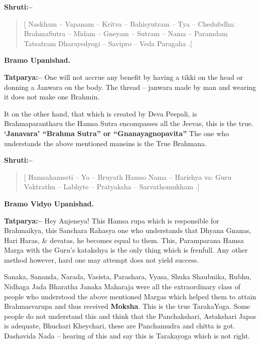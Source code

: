 \textbf{Shruti:–}

\begin{verse}
[ Naskham – Vapanam – Kritva – Bahisyutram – Tya – Chedubdha:  BrahmaSutra – Midam – Gneyam – Sutram – Nama – Paramdam  Tatsatram Dharayedyogi – Savipro – Veda Paragaha .]
\end{verse}

\begin{flushright}
\textbf{Bramo Upanishad.}
\end{flushright}

\textbf{Tatparya:–} One will not accrue any benefit by having a tikki on the head or donning a Janwara on the body. The thread – janwara made by man and wearing it does not make one Brahmin.

It on the other hand, that which is created by Deva Peepali, is Brahmaparantharu the Hamsa Sutra encompasses all the Jeevas, this is the true. \textbf{‘Janavara’ “Brahma Sutra” or “Gnanayagnopavita”} The one who understands the above mentioned maneins is the True Brahmana.

\textbf{Shruti:–}

\begin{verse}
[ Hamsahamseti – Yo – Bruyath  Hamso Nama – Harishya va:  Guru Vaktrathu – Labhyte – Pratyaksha – Sarvathomukham .]
\end{verse}

\begin{flushright}
\textbf{Bramo Vidyo Upanishad.}
\end{flushright}

\textbf{Tatparya:–} Hey Anjeneya! This Hamsa rupa which is responsible for Brahmaikya, this Sanchara Rahasya one who understands that Dhyana Gnanas, Hari Haras, \& devatas, he becomes equal to them. This, Paramparana Hamsa Marga with the Guru's katakshya is the only thing which is frenfull. Any other method however, hard one may attempt does not yield success.

Sanaka, Sananda, Narada, Vasista, Parashara, Vyasa, Shuka Shaubnika, Rubhu, Nidhaga Jada Bharatha Janaka Maharaja were all the extraordinary class of people who understood the above mentioned Margas which helped them to attain Brahmasvarupa and thus received \textbf{Moksha}. This is the true TarakaYoga. Some people do not understand this and think that the Panchakshari, Astakshari Japas is adequate, Bhuchari Kheychari, these are Panchamudra and chitta is got. Dashavida Nada – hearing of this and say this is Tarakayoga which is not right.


